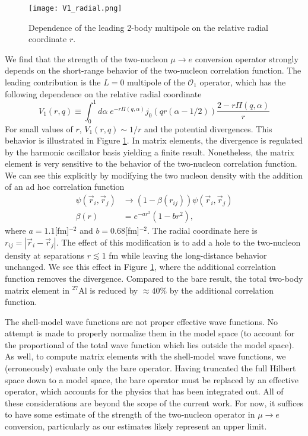 \documentclass{book}[letterpaper,12pt]
\begin{document}
\begin{figure}
\centering
\texttt{[image: V1\_radial.png]}
\caption{Dependence of the leading 2-body multipole on the relative radial coordinate $r$.}
\label{fig:V1_radial}
\end{figure}

We find that the strength of the two-nucleon $\mu\rightarrow e$ conversion operator strongly depends on the short-range behavior of the two-nucleon correlation function. The leading contribution is the $L=0$ multipole of the $\mathcal{O}_1$ operator, which has the following dependence on the relative radial coordinate
\begin{equation}
V_1(r,q)\equiv \int_0^1d\alpha\;e^{-r\Pi(q,\alpha)}j_0(qr(\alpha-1/2))\frac{2-r\Pi(q,\alpha)}{r}
\end{equation}
For small values of $r$, $V_1(r,q)\sim 1/r$ and the potential divergences. This behavior is illustrated in Figure \ref{fig:V1_radial}. In matrix elements, the divergence is regulated by the harmonic oscillator basis yielding a finite result. Nonetheless, the matrix element is very sensitive to the behavior of the two-nucleon correlation function. We can see this explicitly by modifying the two nucleon density with the addition of an ad hoc correlation function
\begin{equation}
\begin{split}
\psi(\vec{r}_i,\vec{r}_j)&\rightarrow\left(1-\beta(r_{ij})\right)\psi(\vec{r}_i,\vec{r}_j)\\
\beta(r)&=e^{-ar^2}\left(1-br^2\right),
\label{eq:f_corr}
\end{split}
\end{equation}
where $a=1.1$[fm]$^{-2}$ and $b=0.68$[fm]$^{-2}$. The radial coordinate here is $r_{ij}=|\vec{r}_i-\vec{r}_j|$. The effect of this modification is to add a hole to the two-nucleon density at separations $r\lesssim 1$ fm while leaving the long-distance behavior unchanged. We see this effect in Figure \ref{fig:V1_radial}, where the additional correlation function removes the divergence. Compared to the bare result, the total two-body matrix element in $^{27}$Al is reduced by $\approx 40\%$ by the additional correlation function. 

The shell-model wave functions are not proper effective wave functions. No attempt is made to properly normalize them in the model space (to account for the proportional of the total wave function which lies outside the model space). As well, to compute matrix elements with the shell-model wave functions, we (erroneously) evaluate only the bare operator. Having truncated the full Hilbert space down to a model space, the bare operator must be replaced by an effective operator, which accounts for the physics that has been integrated out. All of these considerations are beyond the scope of the current work. For now, it suffices to have some estimate of the strength of the two-nucleon operator in $\mu\rightarrow e$ conversion, particularly as our estimates likely represent an upper limit.
\end{document}
